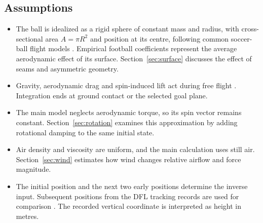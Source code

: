 \documentclass[12pt,letterpaper]{article}
\begin{document}
\subsection{Assumptions}
\begin{itemize}
\item The ball is idealized as a rigid sphere of constant mass and radius, with cross-sectional area $A=\pi R^2$ and position at its centre, following common soccer-ball flight models \cite{maponi,bray,myers}. Empirical football coefficients represent the average aerodynamic effect of its surface. Section~\ref{sec:surface} discusses the effect of seams and asymmetric geometry.
\item Gravity, aerodynamic drag and spin-induced lift act during free flight \cite{maponi,bray}. Integration ends at ground contact or the selected goal plane.
\item The main model neglects aerodynamic torque, so its spin vector remains constant. Section~\ref{sec:rotation} examines this approximation by adding rotational damping to the same initial state.
\item Air density and viscosity are uniform, and the main calculation uses still air. Section~\ref{sec:wind} estimates how wind changes relative airflow and force magnitude.
\item The initial position and the next two early positions determine the inverse input. Subsequent positions from the DFL tracking records are used for comparison \cite{bassek,dataset}. The recorded vertical coordinate is interpreted as height in metres.
\end{itemize}
\end{document}
